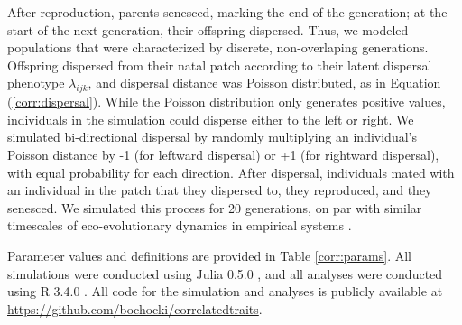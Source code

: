 \documentclass[11pt]{article}
\begin{document}
After reproduction, parents senesced, marking the end of the generation; at the start of the next generation, their offspring dispersed.
Thus, we modeled populations that were characterized by discrete, non-overlaping generations.
Offspring dispersed from their natal patch according to their latent dispersal phenotype $\lambda_{ijk}$, and dispersal distance was Poisson distributed, as in Equation (\ref{corr:dispersal}).
While the Poisson distribution only generates positive values, individuals in the simulation could disperse either to the left or right. We simulated bi-directional dispersal by randomly multiplying an individual's Poisson distance by -1 (for leftward dispersal) or +1 (for rightward dispersal), with equal probability for each direction.
After dispersal, individuals mated with an individual in the patch that they dispersed to, they reproduced, and they senesced.
We simulated this process for 20 generations, on par with similar timescales of eco-evolutionary dynamics in empirical systems \citep{williams_rapid_2016,ochocki_rapid_2017,weiss-lehman_rapid_2017}.

Parameter values and definitions are provided in Table \ref{corr:params}. All simulations were conducted using Julia 0.5.0 \citep{bezanson_julia:_2017}, and all analyses were conducted using R 3.4.0 \citep{r_core_team_r:_2015}.
All code for the simulation and analyses is publicly available at \url{https://github.com/bochocki/correlatedtraits}.
\end{document}
